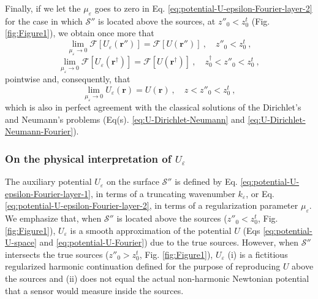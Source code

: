 Finally, if we let the $\mu_{\varepsilon}$ 
goes to zero in Eq. \ref{eq:potential-U-epsilon-Fourier-layer-2} for the case in which 
$\mathcal{S}''$ is located above the sources, at $z''_{0} < z^{t}_{0}$ (Fig. \ref{fig:Figure1}), 
we obtain once more that 
\begin{equation}
	\lim_{\mu_{\varepsilon}\to 0} \mathcal{F} \left[ U_{\varepsilon}(\mathbf{r}'') \right] = 
	\mathcal{F} \left[ U(\mathbf{r}'') \right] \: , \quad z''_{0} < z^{t}_{0} \: ,
	\label{eq:lim-muepsilon-potential-U-epsilon-Fourier-layer}
\end{equation}
\begin{equation}
	\lim_{\mu_{\varepsilon}\to 0} \mathcal{F} \left[ U_{\varepsilon}(\mathbf{r}^{\dagger}) \right] = 
	\mathcal{F} \left[ U(\mathbf{r}^{\dagger}) \right] \: , \quad z^{\dagger}_{0} < z''_{0} < z^{t}_{0} \: ,
	\label{eq:lim-muepsilon-potential-U-epsilon-Fourier-dagger}
\end{equation}
pointwise and, consequently, that
\begin{equation}
	\lim_{\mu_{\varepsilon}\to 0} U_{\varepsilon}(\mathbf{r}) = 
	U(\mathbf{r}) \: , \quad z < z''_{0} < z^{t}_{0} \: ,
	\label{eq:lim-muepsilon-potential-U-epsilon-space}
\end{equation}
which is also in perfect agreement with the classical solutions of the Dirichlet's and Neumann's
problems (Eq(s). \ref{eq:U-Dirichlet-Neumann} and \ref{eq:U-Dirichlet-Neumann-Fourier}).

\subsubsection{On the physical interpretation of $U_{\varepsilon}$}

The auxiliary potential $U_{\varepsilon}$ on the surface $\mathcal{S}''$ is defined by Eq. 
\ref{eq:potential-U-epsilon-Fourier-layer-1}, in terms of a truncating wavenumber $k_{\varepsilon}$,
or Eq. \ref{eq:potential-U-epsilon-Fourier-layer-2}, in terms of a regularization parameter $\mu_{\varepsilon}$.
We emphasize that, when $\mathcal{S}''$ is located above the sources ($z''_{0} < z^{t}_{0}$, Fig. \ref{fig:Figure1}),
$U_{\varepsilon}$ is a smooth approximation of the potential $U$ (Eqs \ref{eq:potential-U-space} and \ref{eq:potential-U-Fourier}) 
due to the true sources.
However, when $\mathcal{S}''$ intersects the true sources ($z''_{0} > z^{t}_{0}$, Fig. \ref{fig:Figure1}), 
$U_{\varepsilon}$ (i) is a fictitious regularized harmonic continuation defined for the purpose of reproducing $U$ above the sources
and (ii) does not equal the actual non-harmonic Newtonian potential that a sensor would measure inside the sources.

